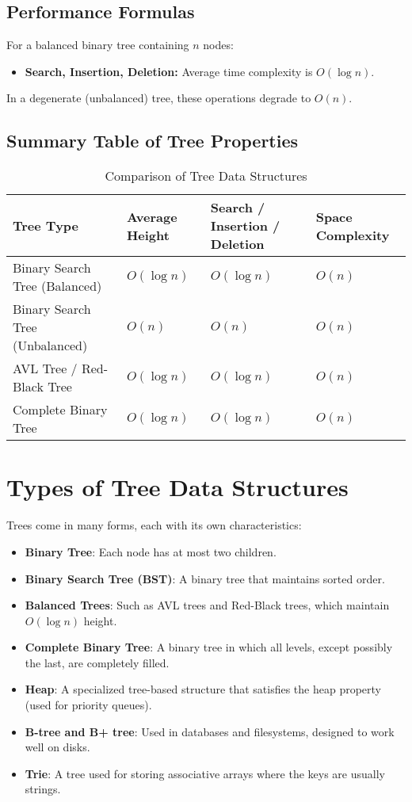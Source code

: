 \subsection{Performance Formulas}
For a balanced binary tree containing \( n \) nodes:
\begin{itemize}
    \item \textbf{Search, Insertion, Deletion:} Average time complexity is \( O(\log n) \).
\end{itemize}
In a degenerate (unbalanced) tree, these operations degrade to \( O(n) \).

\subsection{Summary Table of Tree Properties}
\begin{table}[h!]
\centering
\small
\begin{tabular}{p{3.5cm} p{3cm} p{4cm} p{3cm}}
\toprule
\textbf{Tree Type} & \textbf{Average Height} & \textbf{Search / Insertion / Deletion} & \textbf{Space Complexity} \\
\midrule
Binary Search Tree (Balanced)   & \( O(\log n) \) & \( O(\log n) \) & \( O(n) \) \\
Binary Search Tree (Unbalanced) & \( O(n) \)      & \( O(n) \)      & \( O(n) \) \\
AVL Tree / Red-Black Tree       & \( O(\log n) \) & \( O(\log n) \) & \( O(n) \) \\
Complete Binary Tree            & \( O(\log n) \) & \( O(\log n) \) & \( O(n) \) \\
\bottomrule
\end{tabular}
\caption{Comparison of Tree Data Structures}
\label{tab:tree-comparison}
\normalsize
\end{table}





\section{Types of Tree Data Structures}
Trees come in many forms, each with its own characteristics:
\begin{itemize}
    \item \textbf{Binary Tree}: Each node has at most two children.
    \item \textbf{Binary Search Tree (BST)}: A binary tree that maintains sorted order.
    \item \textbf{Balanced Trees}: Such as AVL trees and Red-Black trees, which maintain \( O(\log n) \) height.
    \item \textbf{Complete Binary Tree}: A binary tree in which all levels, except possibly the last, are completely filled.
    \item \textbf{Heap}: A specialized tree-based structure that satisfies the heap property (used for priority queues).
    \item \textbf{B-tree and B+ tree}: Used in databases and filesystems, designed to work well on disks.
    \item \textbf{Trie}: A tree used for storing associative arrays where the keys are usually strings.
\end{itemize}

